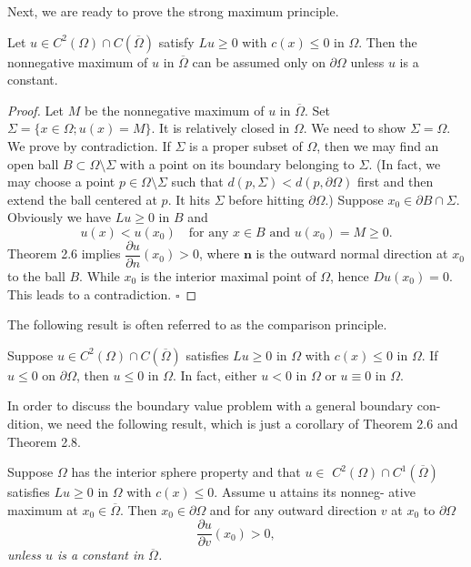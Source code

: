 Next, we are ready to prove the strong maximum principle.

\begin{theorem}\label{hanlin:maxprin-theorem-2-8}
Let $u \in C^2(\Omega) \cap C(\overline{\Omega})$ satisfy $Lu \ge 0$ with $c(x) \le 0$ in $\Omega$.
Then the nonnegative maximum of $u$ in $\overline{\Omega}$ can be assumed only on $\partial\Omega$ unless $u$ is
a constant.
\end{theorem}
\begin{proof}
\sketch
Let $M$ be the nonnegative maximum of $u$ in $\overline{\Omega}$. Set $\Sigma = \{x \in \Omega;u(x)=
M\}$. It is relatively closed in $\Omega$. We need to show $\Sigma = \Omega$.
We prove by contradiction. If $\Sigma$ is a proper subset of $\Omega$, then we may find an
open ball $B \subset \Omega \setminus \Sigma$ with a point on its boundary belonging to $\Sigma$. (In fact, we may
choose a point $p \in \Omega \setminus \Sigma$ such that $d(p,\Sigma) < d(p,\partial\Omega)$ first and then extend the ball
centered at $p$. It hits $\Sigma$ before hitting $\partial\Omega$.) Suppose $x_0 \in \partial B \cap \Sigma$. Obviously we
have $Lu \ge 0$ in $B$ and
\[
u(x) < u(x_0) \quad \text{for any } x \in B \text{ and } u(x_0)=M \ge 0.
\]
Theorem 2.6 implies $\dfrac{\partial u}{\partial n}(x_0)>0$, where $\mathbf{n}$ is the outward normal direction at $x_0$ to
the ball $B$. While $x_0$ is the interior maximal point of $\Omega$, hence $Du(x_0)=0$. This
leads to a contradiction. $\square$
\end{proof}

The following result is often referred to as the comparison principle.

\begin{corollary}\label{hanlin:maxprin-cor-2-9}
Suppose $u \in C^2(\Omega)\cap C(\overline{\Omega})$ satisfies $Lu \ge 0$ in $\Omega$ with $c(x)\le 0$
in $\Omega$. If $u \le 0$ on $\partial\Omega$, then $u \le 0$ in $\Omega$. In fact, either $u < 0$ in $\Omega$ or $u \equiv 0$ in $\Omega$.
\end{corollary}

In order to discuss the boundary value problem with a general boundary con-
dition, we need the following result, which is just a corollary of Theorem 2.6 and
Theorem 2.8.

\begin{corollary}\label{hanlin:maxprin-cor-2-10}
Suppose $\Omega$ has the interior sphere property and that $u \in$
$C^2(\Omega)\cap C^1(\overline{\Omega})$ satisfies $Lu \ge 0$ in $\Omega$ with $c(x)\le 0$. Assume u attains its nonneg-
ative maximum at $x_0 \in \overline{\Omega}$. Then $x_0 \in \partial\Omega$ and for any outward direction $v$ at $x_0$ to
$\partial\Omega$
\[
\frac{\partial u}{\partial v}(x_0)>0,
\]
\textit{unless $u$ is a constant in $\overline{\Omega}$.}
\end{corollary}


